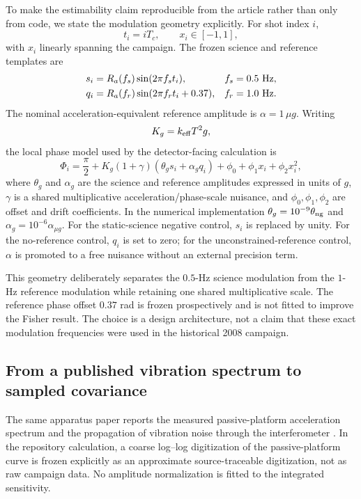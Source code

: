 To make the estimability claim reproducible from the article rather than only from code, we state the modulation geometry explicitly. For shot index $i$,
\begin{equation}
t_i=iT_c,\qquad x_i\in[-1,1],
\end{equation}
with $x_i$ linearly spanning the campaign. The frozen science and reference templates are
\begin{align}
s_i&=R_a(f_s)\sin(2\pi f_s t_i), & f_s&=0.5\ {\rm Hz},\\
q_i&=R_a(f_r)\sin(2\pi f_r t_i+0.37), & f_r&=1.0\ {\rm Hz}.
\label{eq:templates}
\end{align}
The nominal acceleration-equivalent reference amplitude is $\alpha=1\,\mu g$. Writing
\begin{equation}
K_g=k_{\rm eff}T^2g,
\end{equation}
the local phase model used by the detector-facing calculation is
\begin{equation}
\Phi_i=\frac{\pi}{2}+K_g(1+\gamma)
\left(\theta_g s_i+\alpha_g q_i\right)
+\phi_0+\phi_1x_i+\phi_2x_i^2,
\label{eq:frozen-phase-model}
\end{equation}
where $\theta_g$ and $\alpha_g$ are the science and reference amplitudes expressed in units of $g$, $\gamma$ is a shared multiplicative acceleration/phase-scale nuisance, and $\phi_0,\phi_1,\phi_2$ are offset and drift coefficients. In the numerical implementation $\theta_g=10^{-9}\theta_{\rm ng}$ and $\alpha_g=10^{-6}\alpha_{\mu g}$. For the static-science negative control, $s_i$ is replaced by unity. For the no-reference control, $q_i$ is set to zero; for the unconstrained-reference control, $\alpha$ is promoted to a free nuisance without an external precision term.

This geometry deliberately separates the $0.5$-Hz science modulation from the $1$-Hz reference modulation while retaining one shared multiplicative scale. The reference phase offset $0.37$ rad is frozen prospectively and is not fitted to improve the Fisher result. The choice is a design architecture, not a claim that these exact modulation frequencies were used in the historical 2008 campaign.

\subsection{From a published vibration spectrum to sampled covariance}

The same apparatus paper reports the measured passive-platform acceleration spectrum and the propagation of vibration noise through the interferometer \cite{LeGouet2008}. In the repository calculation, a coarse log--log digitization of the passive-platform curve is frozen explicitly as an approximate source-traceable digitization, not as raw campaign data. No amplitude normalization is fitted to the integrated sensitivity.


